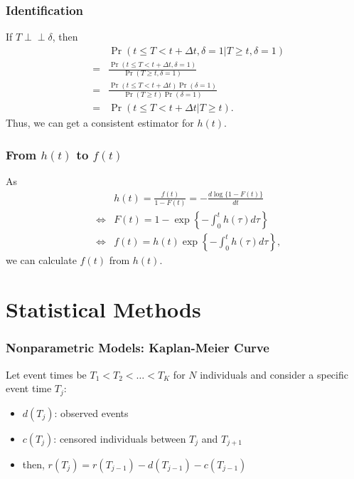 \documentclass[aspectratio=169, 12pt]{beamer}
\newcommand{\indep}{\perp \!\!\! \perp}
\begin{document}
	\begin{frame}
	\frametitle{Identification}
	If $T \indep \delta$, then
	\begin{eqnarray*}
	&\phantom{=}& \Pr(t \leq T < t + \Delta t, \delta = 1 | T \geq t, \delta = 1)\\
	&=& \frac{\Pr(t \leq T < t + \Delta t, \delta = 1)}{\Pr(T \geq t, \delta = 1)}\\
	&=& \frac{\Pr(t \leq T < t + \Delta t) \Pr(\delta = 1)}{\Pr(T \geq t) \Pr(\delta = 1)}\\
	&=& \Pr(t \leq T < t + \Delta t | T \geq t).
	\end{eqnarray*}
	Thus, we can get a consistent estimator for $h(t)$.

	\end{frame}

	\begin{frame}
	\frametitle{From $h(t)$ to $f(t)$}
	As
	\begin{eqnarray*}
	&\phantom{\Leftrightarrow}& h(t) = \frac{f(t)}{1-F(t)} = -\frac{d\log \{1-F(t)\}}{dt}\\
	&\Leftrightarrow& F(t) = 1-\exp \left\{-\int_0^t h(\tau) d\tau \right\}\\
	&\Leftrightarrow& f(t) = h(t) \exp \left\{-\int_0^t h(\tau) d\tau \right\},
	\end{eqnarray*}
	we can calculate $f(t)$ from $h(t)$.

	\end{frame}


	\section{Statistical Methods}

	\begin{frame}
	\frametitle{Nonparametric Models: Kaplan-Meier Curve}
	Let event times be $T_1 < T_2 < \dots < T_K$ for $N$ individuals and consider a specific event time $T_j$:
	\begin{itemize}
	\item $d(T_j)$: observed events
	\item $c(T_j)$: censored individuals between $T_{j}$ and $T_{j+1}$
	\item then, $r(T_j) = r(T_{j-1}) - d(T_{j-1}) - c(T_{j-1})$

	\end{itemize}

	\end{frame}
\end{document}
